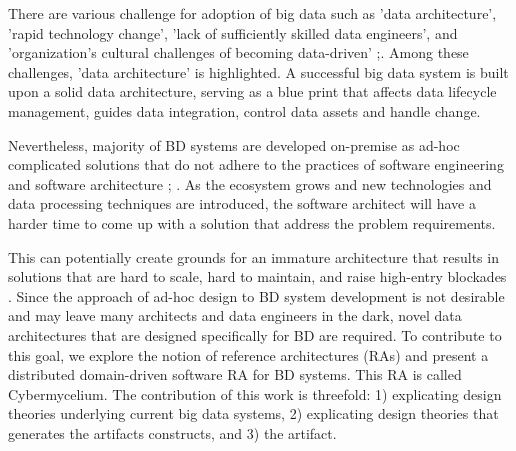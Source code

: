 \documentclass[review]{elsarticle}
\begin{document}
There are various challenge for adoption of big data such as 'data architecture', 'rapid technology change', 'lack of sufficiently skilled data engineers', and 'organization's cultural challenges of becoming data-driven' \cite{AtaeiBigDataEnvirons};\cite{Singh}. Among these challenges, 'data architecture' is highlighted. A successful big data system is built upon a solid data architecture, serving as a blue print that affects data lifecycle management, guides data integration, control data assets and handle change. 



Nevertheless, majority of BD systems are developed on-premise as ad-hoc complicated solutions that do not adhere to the practices of software engineering and software architecture \cite{Gorton}; \cite{Nadal}. As the ecosystem grows and new technologies and data processing techniques are introduced, the software architect will have a harder time to come up with a solution that address the problem requirements.

This can potentially create grounds for an immature architecture that results in solutions that are hard to scale, hard to maintain, and raise high-entry blockades \cite{AtaeiApsec}. Since the approach of ad-hoc design to BD system development is not desirable and may leave many architects and data engineers in the dark, novel data architectures that are designed specifically for BD are required. To contribute to this goal, we explore the notion of reference architectures (RAs) and present a distributed domain-driven software RA for BD systems. This RA is called Cybermycelium. The contribution of this work is threefold: 1) explicating design theories underlying current big data systems, 2) explicating design theories that generates the artifacts constructs, and 3) the artifact. 
\end{document}
